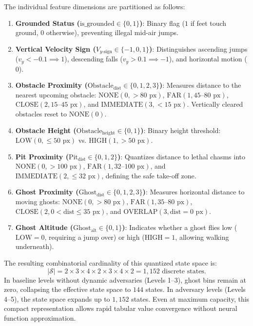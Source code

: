 The individual feature dimensions are partitioned as follows:
\begin{enumerate}
    \item \textbf{Grounded Status ($\text{is\_grounded} \in \{0, 1\}$)}: Binary flag ($1$ if feet touch ground, $0$ otherwise), preventing illegal mid-air jumps.
    \item \textbf{Vertical Velocity Sign ($V_{y\text{-sign}} \in \{-1, 0, 1\}$)}: Distinguishes ascending jumps ($v_y < -0.1 \implies 1$), descending falls ($v_y > 0.1 \implies -1$), and horizontal motion ($0$).
    \item \textbf{Obstacle Proximity ($\text{Obstacle}_{\text{dist}} \in \{0, 1, 2, 3\}$)}: Measures distance to the nearest upcoming obstacle: $\text{NONE} (0, > 80\text{ px})$, $\text{FAR} (1, 45\text{--}80\text{ px})$, $\text{CLOSE} (2, 15\text{--}45\text{ px})$, and $\text{IMMEDIATE} (3, < 15\text{ px})$. Vertically cleared obstacles reset to $\text{NONE} (0)$.
    \item \textbf{Obstacle Height ($\text{Obstacle}_{\text{height}} \in \{0, 1\}$)}: Binary height threshold: $\text{LOW} (0, \le 50\text{ px})$ vs. $\text{HIGH} (1, > 50\text{ px})$.
    \item \textbf{Pit Proximity ($\text{Pit}_{\text{dist}} \in \{0, 1, 2\}$)}: Quantizes distance to lethal chasms into $\text{NONE} (0, > 100\text{ px})$, $\text{FAR} (1, 32\text{--}100\text{ px})$, and $\text{IMMEDIATE} (2, \le 32\text{ px})$, defining the safe take-off zone.
    \item \textbf{Ghost Proximity ($\text{Ghost}_{\text{dist}} \in \{0, 1, 2, 3\}$)}: Measures horizontal distance to moving ghosts: $\text{NONE} (0, > 80\text{ px})$, $\text{FAR} (1, 35\text{--}80\text{ px})$, $\text{CLOSE} (2, 0 < \text{dist} \le 35\text{ px})$, and $\text{OVERLAP} (3, \text{dist} = 0\text{ px})$.
    \item \textbf{Ghost Altitude ($\text{Ghost}_{\text{alt}} \in \{0, 1\}$)}: Indicates whether a ghost flies low ($\text{LOW} = 0$, requiring a jump over) or high ($\text{HIGH} = 1$, allowing walking underneath).
\end{enumerate}

The resulting combinatorial cardinality of this quantized state space is:
\begin{equation}
|\mathcal{S}| = 2 \times 3 \times 4 \times 2 \times 3 \times 4 \times 2 = 1{,}152 \text{ discrete states.}
\end{equation}
In baseline levels without dynamic adversaries (Levels 1--3), ghost bins remain at zero, collapsing the effective state space to $144$ states. In adversary levels (Levels 4--5), the state space expands up to $1{,}152$ states. Even at maximum capacity, this compact representation allows rapid tabular value convergence without neural function approximation.


